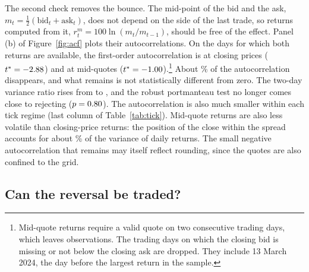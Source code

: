\documentclass[11pt,a4paper]{article}
\begin{document}
The second check removes the bounce. The mid-point of the bid and the ask, $m_t=\tfrac12(\text{bid}_t+\text{ask}_t)$, does not depend on the side of the last trade, so returns computed from it, $r^{m}_t=100\ln(m_t/m_{t-1})$, should be free of the effect. Panel (b) of Figure~\ref{fig:acf} plots their autocorrelations. On the days for which both returns are available, the first-order autocorrelation is \sameRho{} at closing prices ($t^{*}=-2.88$) and \midRho{} at mid-quotes ($t^{*}=-1.00$).\footnote{Mid-quote returns require a valid quote on two consecutive trading days, which leaves \qNmid{} observations. The \qInvalid{} trading days on which the closing bid is missing or not below the closing ask are dropped. They include 13 March 2024, the day before the largest return in the sample.} About \midDrop\% of the autocorrelation disappears, and what remains is not statistically different from zero. The two-day variance ratio rises from \sameVrTwo{} to \midVrTwo{}, and the robust portmanteau test no longer comes close to rejecting ($p=0.80$). The autocorrelation is also much smaller within each tick regime (last column of Table~\ref{tab:tick}). Mid-quote returns are also less volatile than closing-price returns: the position of the close within the spread accounts for about \qNoise\% of the variance of daily returns. The small negative autocorrelation that remains may itself reflect rounding, since the quotes are also confined to the grid.

\subsection{Can the reversal be traded?}\label{sec:trade}
\end{document}
